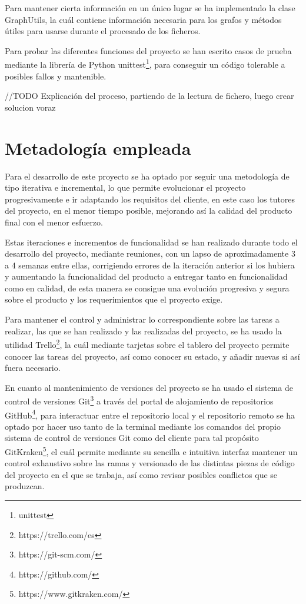 Para mantener cierta información en un único lugar se ha implementado la clase GraphUtils, la cuál contiene información necesaria para los grafos y métodos útiles para usarse durante el procesado de los ficheros.

Para probar las diferentes funciones del proyecto se han escrito casos de prueba mediante la librería de Python unittest\footnote{unittest}, para conseguir un código tolerable a posibles fallos y mantenible.

//TODO Explicación del proceso, partiendo de la lectura de fichero, luego crear solucion voraz


\section{Metadología empleada}
Para el desarrollo de este proyecto se ha optado por seguir una metodología de tipo iterativa e incremental, lo que permite evolucionar el proyecto progresivamente e ir adaptando los requisitos del cliente, en este caso los tutores del proyecto, en el menor tiempo posible, mejorando así la calidad del producto final con el menor esfuerzo.

Estas iteraciones e incrementos de funcionalidad se han realizado durante todo el desarrollo del proyecto, mediante reuniones, con un lapso de aproximadamente 3 a 4 semanas entre ellas, corrigiendo errores de la iteración anterior si los hubiera y aumentando la funcionalidad del producto a entregar tanto en funcionalidad como en calidad, de esta manera se consigue una evolución progresiva y segura sobre el producto y los requerimientos que el proyecto exige.

Para mantener el control y administrar lo correspondiente sobre las tareas a realizar, las que se han realizado y las realizadas del proyecto, se ha usado la utilidad Trello\footnote{https://trello.com/es}, la cuál mediante tarjetas sobre el tablero del proyecto permite conocer las tareas del proyecto, así como conocer su estado, y añadir nuevas si así fuera necesario.

En cuanto al mantenimiento de versiones del proyecto se ha usado el sistema de control de versiones Git\footnote{https://git-scm.com/} a través del portal de alojamiento de repositorios GitHub\footnote{https://github.com/}, para interactuar entre el repositorio local y el repositorio remoto se ha optado por hacer uso tanto de la terminal mediante los comandos del propio sistema de control de versiones Git como del cliente para tal propósito GitKraken\footnote{https://www.gitkraken.com/}, el cuál permite mediante su sencilla e intuitiva interfaz mantener un control exhaustivo sobre las ramas y versionado de las distintas piezas de código del proyecto en el que se trabaja, así como revisar posibles conflictos que se produzcan.

